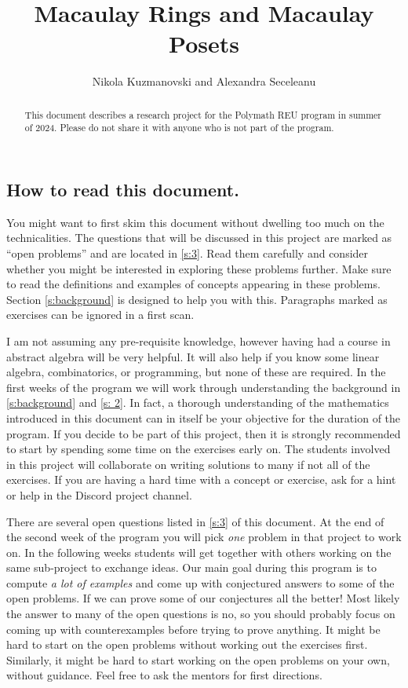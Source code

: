 \documentclass[11pt]{amsart}
\title{Macaulay Rings and Macaulay Posets}
\author{Nikola Kuzmanovski and Alexandra Seceleanu}
\theoremstyle{plain} %
\theoremstyle{definition}
\theoremstyle{remark}
\numberwithin{equation}{section}  %
\begin{document}
\maketitle

\begin{abstract}
This document describes a research project for the Polymath REU program in summer of 2024. Please do not share it with anyone who is not part of the program.
\end{abstract}

\graphicspath{{pictures}}

\subsection*{How to read this document.}
 You might want to first skim this document without dwelling too much on the technicalities. The questions that will be discussed in this project are marked as ``open problems'' and are located in  \cref{s:3}. Read them carefully and consider whether you might be interested in exploring these problems further. Make sure to read the definitions and examples of concepts appearing in these problems. Section \ref{s:background} is designed to help you with this. Paragraphs marked as exercises can be ignored in a first scan.  
 
 I am not assuming any pre-requisite knowledge, however having had a course in abstract algebra will be very helpful. It will also help if you know some linear algebra, combinatorics, or programming, but none of these are required. In the first weeks of the program we will work through understanding the background in \cref{s:background} and \cref{s: 2}. In fact, a thorough understanding of the mathematics introduced in this document  can  in itself be your objective for the duration of the program. If you decide to be part of this project, then it is strongly recommended to start by spending some time on the exercises early on. The students involved in this project will collaborate on writing solutions to many if not all of the exercises. If you are having a hard time with a concept or exercise, ask for a hint or help in the Discord project channel. %
 
 There are several open questions listed in \cref{s:3} of this document. At the end of the second week of the program you will pick {\em one} problem in that project to work on. In the following weeks students will get together with others working on the same sub-project to exchange ideas. Our main goal during this program is to compute {\em a lot of examples} and come up with conjectured answers to some of the open problems.  If we can prove some of our conjectures all the better! Most likely the answer to many of the open questions is no, so you should probably focus on coming up with counterexamples before trying to prove anything. It might be hard to start  on the open problems without working out the exercises first. Similarly, it might be hard to start working on the open problems on your own, without guidance. Feel free to ask the mentors for first directions. 
\end{document}
